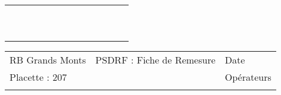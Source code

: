 \documentclass[a4paper, landscape]{article}\usepackage[]{graphicx}\usepackage[]{color}
\begin{document}
{\begin{tabular}{|p{1cm}|p{2cm}|p{1.6cm}|p{1.6cm}|p{1.6cm}|p{1.6cm}|p{1.5cm}|p{1.5cm}|p{1.5cm}|p{1.5cm}|p{1.5cm}|p{7.5cm}|p{5cm}|}
   \rowcolor[gray]{0.95} \hline
 &  &  &  &  &  &  &  &  &  &  &  &  \\ 
   \hline
 &  &  &  &  &  &  &  &  &  &  &  &  \\ 
   \rowcolor[gray]{0.95} \hline
 &  &  &  &  &  &  &  &  &  &  &  &  \\ 
   \hline
 &  &  &  &  &  &  &  &  &  &  &  &  \\ 
   \rowcolor[gray]{0.95} \hline
 &  &  &  &  &  &  &  &  &  &  &  &  \\ 
   \hline
 &  &  &  &  &  &  &  &  &  &  &  &  \\ 
   \rowcolor[gray]{0.95} \hline
 &  &  &  &  &  &  &  &  &  &  &  &  \\ 
   \hline
 &  &  &  &  &  &  &  &  &  &  &  &  \\ 
   \rowcolor[gray]{0.95} \hline
 &  &  &  &  &  &  &  &  &  &  &  &  \\ 
   \hline
 &  &  &  &  &  &  &  &  &  &  &  &  \\ 
   \rowcolor[gray]{0.95} \hline
 &  &  &  &  &  &  &  &  &  &  &  &  \\ 
   \hline
\end{tabular}
}

\begin{tabular}{p{10cm}p{10cm}p{8cm}}
  RB Grands Monts & PSDRF : Fiche de Remesure & Date \\ 
  Placette : 207 &  & Opérateurs \\ 
   &  &  \\ 
  \end{tabular}
\end{document}
